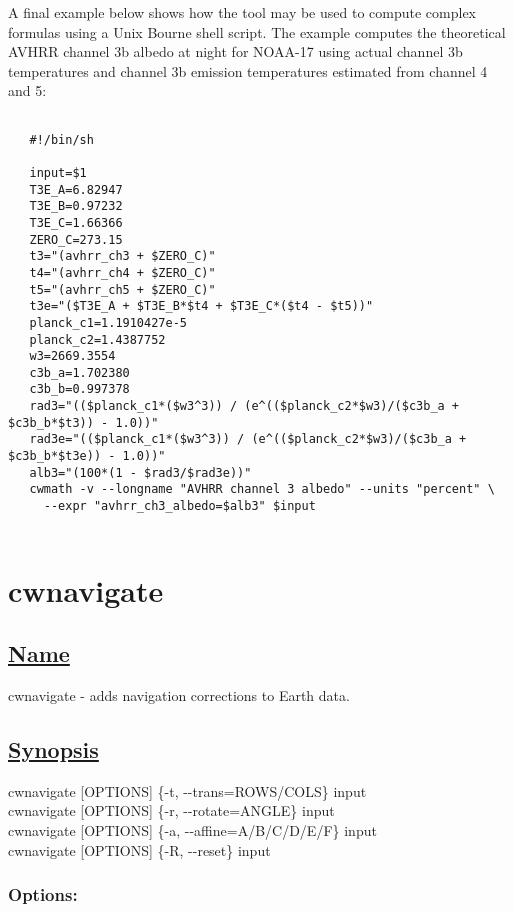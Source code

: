  A final example below shows how the tool may be used to compute complex formulas using a Unix Bourne shell script. The example computes the theoretical AVHRR channel 3b albedo at night for NOAA-17 using actual channel 3b temperatures and channel 3b emission temperatures estimated from channel 4 and 5: \begin{verbatim}

   #!/bin/sh
   
   input=$1
   T3E_A=6.82947
   T3E_B=0.97232
   T3E_C=1.66366
   ZERO_C=273.15
   t3="(avhrr_ch3 + $ZERO_C)"
   t4="(avhrr_ch4 + $ZERO_C)"
   t5="(avhrr_ch5 + $ZERO_C)"
   t3e="($T3E_A + $T3E_B*$t4 + $T3E_C*($t4 - $t5))"
   planck_c1=1.1910427e-5
   planck_c2=1.4387752
   w3=2669.3554
   c3b_a=1.702380
   c3b_b=0.997378
   rad3="(($planck_c1*($w3^3)) / (e^(($planck_c2*$w3)/($c3b_a + $c3b_b*$t3)) - 1.0))"
   rad3e="(($planck_c1*($w3^3)) / (e^(($planck_c2*$w3)/($c3b_a + $c3b_b*$t3e)) - 1.0))"
   alb3="(100*(1 - $rad3/$rad3e))"
   cwmath -v --longname "AVHRR channel 3 albedo" --units "percent" \
     --expr "avhrr_ch3_albedo=$alb3" $input
 
\end{verbatim}


\newpage
\section{cwnavigate} \hypertarget{cwnavigate}{}
\subsection*{\underline{Name}}


   cwnavigate - adds navigation corrections to Earth data.  
\subsection*{\underline{Synopsis}}


  cwnavigate [OPTIONS] \{-t, -{-}trans=ROWS/COLS\} input\\ 
 cwnavigate [OPTIONS] \{-r, -{-}rotate=ANGLE\} input\\ 
 cwnavigate [OPTIONS] \{-a, -{-}affine=A/B/C/D/E/F\} input\\ 
 cwnavigate [OPTIONS] \{-R, -{-}reset\} input\\ 

\subsubsection*{Options:}


